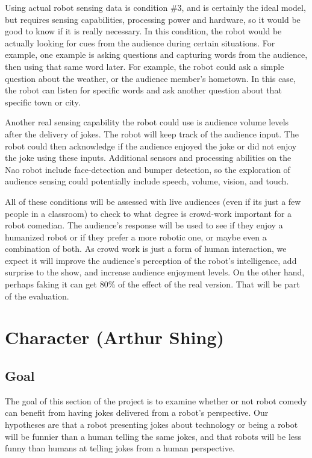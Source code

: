 \documentclass[onecolumn, draftclsnofoot,10pt, compsoc]{IEEEtran}
\begin{document}
Using actual robot sensing data is condition \#3, and is certainly the ideal model, but requires sensing capabilities, processing power and hardware, so it would be good to know if it is really necessary. In this condition, the robot would be actually looking for cues from the audience during certain situations. For example, one example is asking questions and capturing words from the audience, then using that same word later. For example, the robot could ask a simple question about the weather, or the audience member's hometown. In this case, the robot can listen for specific words and ask another question about that specific town or city.

Another real sensing capability the robot could use is  audience volume levels after the delivery of jokes. The robot will keep track of the audience input. The robot could then acknowledge if the audience enjoyed the joke or did not enjoy the joke using these inputs. Additional sensors and processing abilities on the Nao robot include face-detection and bumper detection, so the exploration of audience sensing could potentially include speech, volume, vision, and touch.

All of these conditions will be assessed with live audiences (even if its just a few people in a classroom) to check to what degree is crowd-work important for a robot comedian. The audience's response will be used to see if they enjoy a humanized robot or if they prefer a more robotic one, or maybe even a combination of both. As crowd work is just a form of human interaction, we expect it will improve the audience's perception of the robot's intelligence, add surprise to the show, and increase audience enjoyment levels. On the other hand, perhaps faking it can get 80\% of the effect of the real version. That will be part of the evaluation.

\section{Character (Arthur Shing)}
\subsection{Goal}
The goal of this section of the project is to examine whether or not robot comedy can benefit from having jokes delivered from a robot's perspective. Our hypotheses are that a robot presenting jokes about technology or being a robot will be funnier than a human telling the same jokes, and that robots will be less funny than humans at telling jokes from a human perspective.
\end{document}
